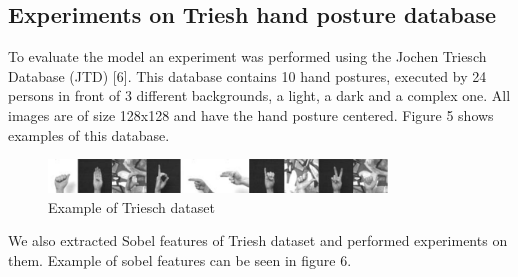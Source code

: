 \documentclass[conference]{IEEEtran}
\begin{document}
\subsection{Experiments on Triesh hand posture database}
To evaluate the model an experiment was performed using the Jochen Triesch
Database (JTD) [6]. This database contains 10 hand postures, executed by 24
persons in front of 3 different backgrounds, a light, a dark and a complex one.
All images are of size 128x128 and have the hand posture centered. Figure 5
shows examples of this database.

\begin{figure}[h]
\includegraphics[width=9cm]{trieshdata}
\caption{Example of Triesch dataset}
\end{figure}

We also extracted Sobel features of Triesh dataset and performed experiments on them.
Example of sobel features can be seen in figure 6.
\end{document}

